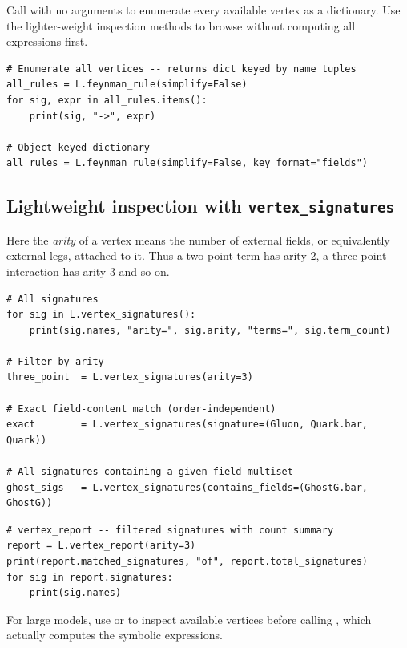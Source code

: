 Call  with no arguments to enumerate every available
vertex as a dictionary.  Use the lighter-weight inspection methods to
browse without computing all expressions first.

\begin{verbatim}
# Enumerate all vertices -- returns dict keyed by name tuples
all_rules = L.feynman_rule(simplify=False)
for sig, expr in all_rules.items():
    print(sig, "->", expr)

# Object-keyed dictionary
all_rules = L.feynman_rule(simplify=False, key_format="fields")
\end{verbatim}

\subsection*{Lightweight inspection with \texttt{vertex\_signatures}}
Here the \emph{arity} of a vertex means the number of external fields, or equivalently external legs, attached to it. Thus a two-point term has arity $2$, a three-point interaction has arity $3$ and so on. 
\begin{verbatim}
# All signatures
for sig in L.vertex_signatures():
    print(sig.names, "arity=", sig.arity, "terms=", sig.term_count)

# Filter by arity
three_point  = L.vertex_signatures(arity=3)

# Exact field-content match (order-independent)
exact        = L.vertex_signatures(signature=(Gluon, Quark.bar, Quark))

# All signatures containing a given field multiset
ghost_sigs   = L.vertex_signatures(contains_fields=(GhostG.bar, GhostG))
\end{verbatim}

\begin{verbatim}
# vertex_report -- filtered signatures with count summary
report = L.vertex_report(arity=3)
print(report.matched_signatures, "of", report.total_signatures)
for sig in report.signatures:
    print(sig.names)
\end{verbatim}

\begin{tcolorbox}[notebox, title=Tip]
For large models, use  or  to
inspect available vertices before calling , which
actually computes the symbolic expressions.
\end{tcolorbox}

